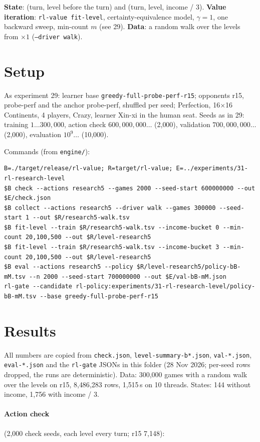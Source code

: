 \documentclass{../polyexp}
\begin{document}
\textbf{State}: (turn, level before the turn) and (turn, level, income / 3). \textbf{Value iteration}: \texttt{rl-value
fit-level}, certainty-equivalence model, $\gamma = 1$, one backward sweep, min-count $m$ (see 29). \textbf{Data}: a
random walk over the levels from $\times1$ (\texttt{--driver walk}).

\section{Setup}
As experiment 29: learner base \texttt{greedy-full-probe-perf-r15}; opponents r15, probe-perf and the anchor
probe-perf, shuffled per seed; Perfection, 16$\times$16 Continents, 4 players, Crazy, learner Xin-xi in the human
seat. Seeds as in 29: training $1\dots300{,}000$, action check $600{,}000{,}000\dots$ (2{,}000), validation
$700{,}000{,}000\dots$ (2{,}000), evaluation $10^9\dots$ (10{,}000).

Commands (from \texttt{engine/}):
\begin{verbatim}
B=./target/release/rl-value; R=target/rl-value; E=../experiments/31-rl-research-level
$B check --actions research5 --games 2000 --seed-start 600000000 --out $E/check.json
$B collect --actions research5 --driver walk --games 300000 --seed-start 1 --out $R/research5-walk.tsv
$B fit-level --train $R/research5-walk.tsv --income-bucket 0 --min-count 20,100,500 --out $R/level-research5
$B fit-level --train $R/research5-walk.tsv --income-bucket 3 --min-count 20,100,500 --out $R/level-research5
$B eval --actions research5 --policy $R/level-research5/policy-bB-mM.tsv --n 2000 --seed-start 700000000 --out $E/val-bB-mM.json
rl-gate --candidate rl-policy:experiments/31-rl-research-level/policy-bB-mM.tsv --base greedy-full-probe-perf-r15
\end{verbatim}

\section{Results}
\ExpResults

All numbers are copied from \texttt{check.json}, \texttt{level-summary-b*.json}, \texttt{val-*.json},
\texttt{eval-*.json} and the \texttt{rl-gate} JSONs in this folder (28 Nov 2026; per-seed rows dropped, the runs are
deterministic). Data: 300{,}000 games with a random walk over the levels on r15, 8{,}486{,}283 rows, 1{,}515\,s on
10 threads. States: 144 without income, 1{,}756 with income / 3.

\paragraph{Action check} (2{,}000 check seeds, each level every turn; r15 7{,}148):
\end{document}
